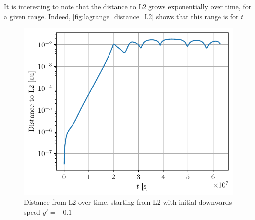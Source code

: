 It is interesting to note that the distance to L2 grows exponentially over time, for a given range. Indeed, \autoref{fig:lagrange_distance_L2} shows that this range is for \(t\)

\begin{figure}[h]
    \centering
    \includegraphics[width=\linewidth]{figures/lagrange_exponential_distance.pdf}
    \caption{Distance from L2 over time, starting from L2 with initial downwards speed \(\dot y' = -0.1\)}
    \label{fig:lagrange_distance_L2}
\end{figure}

